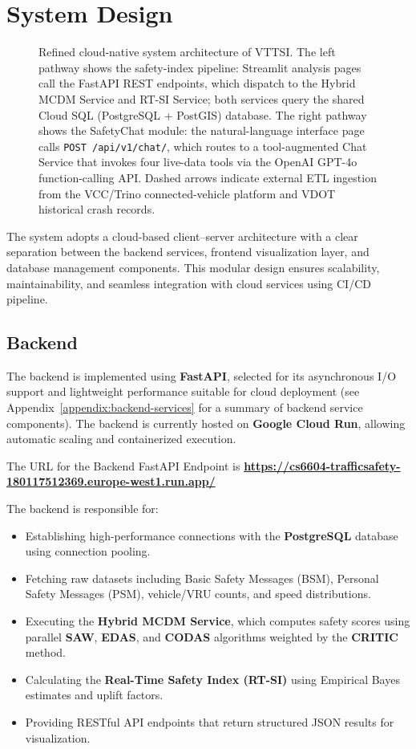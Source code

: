 \documentclass[conference]{IEEEtran}
\begin{document}
\section{System Design}
\label{sec:systemdesign}

\begin{figure}[t]
\centering
\resizebox{\textwidth}{!}{%
%
}
\caption{Refined cloud-native system architecture of VTTSI. The left pathway shows the
safety-index pipeline: Streamlit analysis pages call the FastAPI REST endpoints, which
dispatch to the Hybrid MCDM Service and RT-SI Service; both services query the shared
Cloud SQL (PostgreSQL + PostGIS) database. The right pathway shows the SafetyChat
module: the natural-language interface page calls \texttt{POST /api/v1/chat/}, which
routes to a tool-augmented Chat Service that invokes four live-data tools via the
OpenAI GPT-4o function-calling API. Dashed arrows indicate external ETL ingestion
from the VCC/Trino connected-vehicle platform and VDOT historical crash records.}
\label{fig:system-architecture}
\end{figure}


The system adopts a cloud-based client--server architecture with a clear separation between the backend services, frontend visualization layer, and database management components. This modular design ensures scalability, maintainability, and seamless integration with cloud services using CI/CD pipeline.

\subsection{Backend}
The backend is implemented using \textbf{FastAPI}, selected for its asynchronous I/O support and lightweight performance suitable for cloud deployment (see Appendix~\ref{appendix:backend-services} for a summary of backend service components). The backend is currently hosted on \textbf{Google Cloud Run}, allowing automatic scaling and containerized execution. 

The URL for the Backend FastAPI Endpoint is \textbf{\url{https://cs6604-trafficsafety-180117512369.europe-west1.run.app/}}

\noindent The backend is responsible for:
\begin{itemize}
    \item Establishing high-performance connections with the \textbf{PostgreSQL} database using connection pooling.
    \item Fetching raw datasets including Basic Safety Messages (BSM), Personal Safety Messages (PSM), vehicle/VRU counts, and speed distributions.
    \item Executing the \textbf{Hybrid MCDM Service}, which computes safety scores using parallel \textbf{SAW}, \textbf{EDAS}, and \textbf{CODAS} algorithms weighted by the \textbf{CRITIC} method.
    \item Calculating the \textbf{Real-Time Safety Index (RT-SI)} using Empirical Bayes estimates and uplift factors.
    \item Providing RESTful API endpoints that return structured JSON results for visualization.
\end{itemize}
\end{document}
